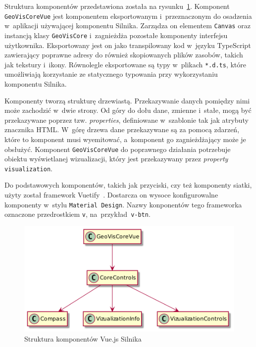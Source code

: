 Struktura komponentów przedstawiona została na rysunku~\ref{fig:c3_vue}. Komponent \texttt{GeoVisCoreVue} jest komponentem eksportowanym i~przeznaczonym do osadzenia w~aplikacji używającej komponentu Silnika. Zarządza on elementem \texttt{Canvas} oraz instancją klasy \texttt{GeoVisCore} i~zagnieżdża pozostałe komponenty interfejsu użytkownika. Eksportowany jest on jako transpilowany kod w~języku TypeScript zawierający poprawne adresy do również skopiowanych plików zasobów, takich jak tekstury i~ikony. Równolegle eksportowane są typy w~plikach \texttt{*.d.ts}, które umożliwiają korzystanie ze statycznego typowania przy wykorzystaniu komponentu Silnika.

Komponenty tworzą strukturę drzewiastą. Przekazywanie danych pomiędzy nimi może zachodzić w~dwie strony. Od góry do dołu dane, zmienne i~stałe, mogą być przekazywane poprzez tzw. \textit{properties}, definiowane w~szablonie tak jak atrybuty znacznika HTML. W~górę drzewa dane przekazywane są za pomocą zdarzeń, które to komponent musi wyemitować, a~komponent go zagnieżdżający może je obsłużyć. Komponent \texttt{GeoVisCoreVue} do poprawnego działania potrzebuje obiektu wyświetlanej wizualizacji, który jest przekazywany przez \textit{property} \texttt{visualization}.

Do podstawowych komponentów, takich jak przyciski, czy też komponenty siatki, użyty został framework Vuetify~\cite{Vuetify}. Dostarcza on wysoce konfigurowalne komponenty w~stylu \texttt{Material Design}. Nazwy konponentów tego frameworka oznaczone przedrostkiem \texttt{v}, na~przykład~\texttt{v-btn}.

\begin{figure}[h]
    \centering
    \includegraphics[scale=0.3]{diagrams/out/c3_vue.png}
    \caption{Struktura komponentów Vue.js Silnika}
    \label{fig:c3_vue}
\end{figure}

